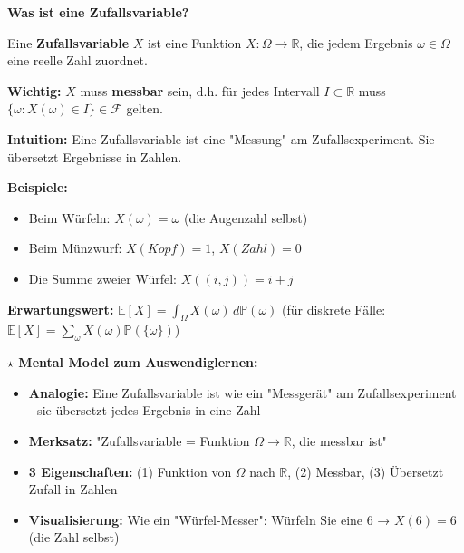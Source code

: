 \begin{denoobification}[Zufallsvariable]
\textbf{Was ist eine Zufallsvariable?}

Eine \textbf{Zufallsvariable} $X$ ist eine Funktion $X: \Omega \to \mathbb{R}$, die jedem Ergebnis $\omega \in \Omega$ eine reelle Zahl zuordnet.

\textbf{Wichtig:} $X$ muss \textbf{messbar} sein, d.h. für jedes Intervall $I \subset \mathbb{R}$ muss $\{\omega : X(\omega) \in I\} \in \mathcal{F}$ gelten.

\textbf{Intuition:} Eine Zufallsvariable ist eine "Messung" am Zufallsexperiment. Sie übersetzt Ergebnisse in Zahlen.

\textbf{Beispiele:}
\begin{itemize}
    \item Beim Würfeln: $X(\omega) = \omega$ (die Augenzahl selbst)
    \item Beim Münzwurf: $X(Kopf) = 1$, $X(Zahl) = 0$
    \item Die Summe zweier Würfel: $X((i,j)) = i + j$
\end{itemize}

\textbf{Erwartungswert:} $\mathbb{E}[X] = \int_{\Omega} X(\omega) \, d\mathbb{P}(\omega)$ (für diskrete Fälle: $\mathbb{E}[X] = \sum_{\omega} X(\omega) \mathbb{P}(\{\omega\})$)

\textbf{$\star$ Mental Model zum Auswendiglernen:}
\begin{itemize}
    \item \textbf{Analogie:} Eine Zufallsvariable ist wie ein "Messgerät" am Zufallsexperiment - sie übersetzt jedes Ergebnis in eine Zahl
    \item \textbf{Merksatz:} "Zufallsvariable = Funktion $\Omega \to \mathbb{R}$, die messbar ist"
    \item \textbf{3 Eigenschaften:} (1) Funktion von $\Omega$ nach $\mathbb{R}$, (2) Messbar, (3) Übersetzt Zufall in Zahlen
    \item \textbf{Visualisierung:} Wie ein "Würfel-Messer": Würfeln Sie eine 6 → $X(6) = 6$ (die Zahl selbst)
\end{itemize}

\begin{center}
\end{center}
\end{denoobification}
